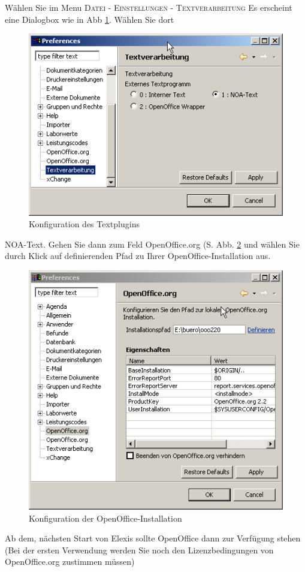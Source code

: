 Wählen Sie im Menu \textsc{Datei - Einstellungen - Textverarbeitung}
Es erscheint eine Dialogbox wie in Abb \ref{fig:text1}. Wählen Sie dort \glqq
\begin{figure}[htp]
\begin{center}
  \includegraphics{images/text1}
  \caption{Konfiguration des Textplugins}
  \label{fig:text1}
\end{center}
\end{figure}

NOA-Text\grqq{}. Gehen Sie dann zum Feld OpenOffice.org (S. Abb. \ref{fig:text2}
und wählen Sie durch Klick auf \glqq definieren\grqq{}den Pfad zu Ihrer
OpenOffice-Installation aus.
\begin{figure}[htp]
\begin{center}
  \includegraphics{images/text2}
  \caption{Konfiguration der OpenOffice-Installation}
  \label{fig:text2}
\end{center}
\end{figure}
Ab dem, nächsten Start von Elexis sollte OpenOffice dann zur Verfügung stehen
(Bei der ersten Verwendung werden Sie noch den Lizenzbedingungen von
OpenOffice.org zustimmen müssen)




